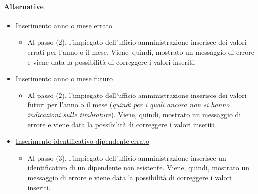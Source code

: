 \paragraph{Alternative}
\begin{itemize}
	\item \underline{Inserimento anno o mese errato}
		\begin{itemize}
			\item Al passo (2), l'impiegato dell'ufficio amministrazione inserisce dei valori errati per l'anno o il mese. Viene, quindi, mostrato un messaggio di errore e viene data la possibilità di correggere i valori inseriti.
		\end{itemize}
	\item \underline{Inserimento anno o mese futuro}
		\begin{itemize}
			\item Al passo (2), l'impiegato dell'ufficio amministrazione inserisce dei valori futuri per l'anno o il mese (\textit{quindi per i quali ancora non si hanno indicazioni sulle timbrature}). Viene, quindi, mostrato un messaggio di errore e viene data la possibilità di correggere i valori inseriti.
		\end{itemize}
	\item \underline{Inserimento identificativo dipendente errato}
		\begin{itemize}
			\item Al passo (3), l'impiegato dell'ufficio amministrazione inserisce un identificativo di un dipendente non esistente. Viene, quindi, mostrato un messaggio di errore e viene data la possibilità di correggere i valori inseriti.
		\end{itemize}
\end{itemize}
